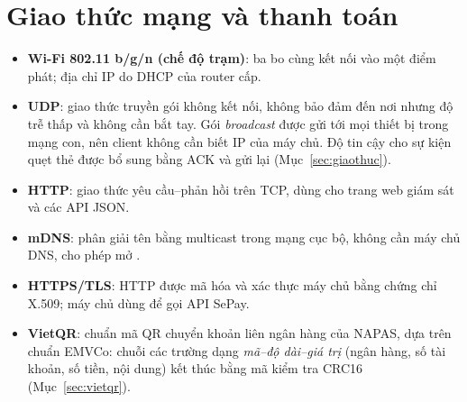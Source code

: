 \section{Giao thức mạng và thanh toán}
\begin{itemize}
  \item \textbf{Wi-Fi 802.11 b/g/n (chế độ trạm)}: ba bo cùng kết nối vào một điểm phát; địa
        chỉ IP do DHCP của router cấp.
  \item \textbf{UDP}: giao thức truyền gói không kết nối, không bảo đảm đến nơi nhưng độ trễ
        thấp và không cần bắt tay. Gói \emph{broadcast} được gửi tới mọi thiết bị trong mạng
        con, nên client không cần biết IP của máy chủ. Độ tin cậy cho sự kiện quẹt thẻ được bổ
        sung bằng ACK và gửi lại (Mục~\ref{sec:giaothuc}).
  \item \textbf{HTTP}: giao thức yêu cầu–phản hồi trên TCP, dùng cho trang web giám sát và các
        API JSON.
  \item \textbf{mDNS}: phân giải tên  bằng multicast trong mạng cục bộ, không cần
        máy chủ DNS, cho phép mở .
  \item \textbf{HTTPS/TLS}: HTTP được mã hóa và xác thực máy chủ bằng chứng chỉ X.509; máy chủ
        dùng để gọi API SePay.
  \item \textbf{VietQR}: chuẩn mã QR chuyển khoản liên ngân hàng của NAPAS, dựa trên chuẩn
        EMVCo: chuỗi các trường dạng \emph{mã–độ dài–giá trị} (ngân hàng, số tài khoản, số tiền,
        nội dung) kết thúc bằng mã kiểm tra CRC16 (Mục~\ref{sec:vietqr}).
\end{itemize}
